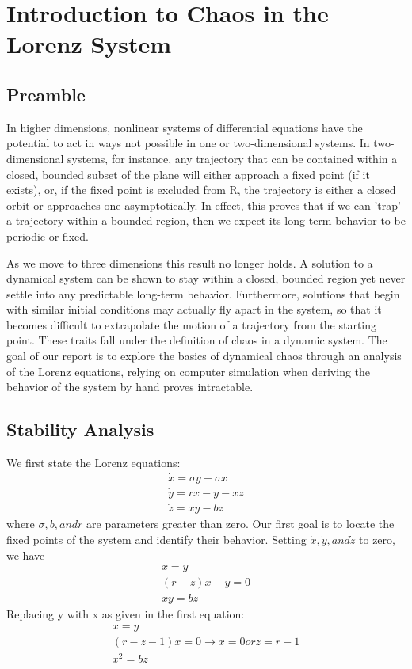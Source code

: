 \documentclass{report}
\begin{document}
\chapter{Introduction to Chaos in the Lorenz System}
\section{Preamble}
In higher dimensions, nonlinear systems of differential equations have the
potential to act in ways not possible in one or two-dimensional systems. In 
two-dimensional systems, for instance, any trajectory that can be contained within a closed, bounded subset of the plane will either approach a fixed point
(if it exists), or, if the fixed point is excluded from R, the trajectory is
either a closed orbit or approaches one asymptotically. In effect, this proves
that if we can 'trap' a trajectory within a bounded region, then we expect its 
long-term behavior to be periodic or fixed.
	
As we move to three dimensions this result no longer holds. A solution to a
dynamical system can be shown to stay within a closed, bounded region yet
never settle into any predictable long-term behavior. Furthermore, solutions 
that begin with similar initial conditions may actually fly apart in the 
system, so that it becomes difficult to extrapolate the motion of a trajectory 
from the starting point. These traits fall under the definition of chaos in a
dynamic system. The goal of our report is to explore the basics of dynamical 
chaos through an analysis of the Lorenz equations, relying on computer
simulation when deriving the behavior of the system by hand proves intractable.

\section{Stability Analysis}

We first state the Lorenz equations:
\begin{align*}
   \dot{x} = \sigma y - \sigma x \\
   \dot{y} = rx - y - xz \\
   \dot{z} = xy - bz
\end{align*}
where \( \sigma , b, and r \) are parameters greater than zero. Our first goal is to
locate the fixed points of the system and identify their behavior. Setting
\( \dot{x}, \dot{y}, and \dot{z}\) to zero, we have
\begin{align*}
   x = y \\
   (r-z)x - y = 0 \\
   xy = bz
\end{align*}
Replacing y with x as given in the first equation:
\begin{align*}
  x = y \\
  (r-z-1)x = 0 \longrightarrow x = 0 or z = r-1 \\
  x^2 = bz
\end{align*}
\end{document}
